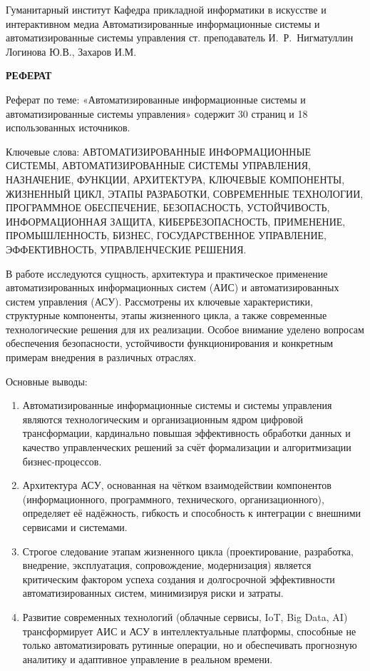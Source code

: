 \documentclass{SibFU-docs}
\begin{document}
\renewcommand{\contentsname}{}
\mycovertitle
{Гуманитарный институт}
{Кафедра прикладной информатики в искусстве и интерактивном медиа}
{Автоматизированные информационные системы и автоматизированные системы управления}
{ст. преподаватель И.~Р.~Нигматуллин}
{Логинова Ю.В., Захаров И.М.}
 
\begin{center}
\bfseries РЕФЕРАТ
\end{center}
\noindent

Реферат по теме: «Автоматизированные информационные системы и автоматизированные системы управления» содержит 30 страниц и 18 использованных источников.

Ключевые слова:
АВТОМАТИЗИРОВАННЫЕ ИНФОРМАЦИОННЫЕ СИСТЕМЫ, АВТОМАТИЗИРОВАННЫЕ СИСТЕМЫ УПРАВЛЕНИЯ, НАЗНАЧЕНИЕ, ФУНКЦИИ, АРХИТЕКТУРА, КЛЮЧЕВЫЕ КОМПОНЕНТЫ, ЖИЗНЕННЫЙ ЦИКЛ, ЭТАПЫ РАЗРАБОТКИ, СОВРЕМЕННЫЕ ТЕХНОЛОГИИ, ПРОГРАММНОЕ ОБЕСПЕЧЕНИЕ, БЕЗОПАСНОСТЬ, УСТОЙЧИВОСТЬ, ИНФОРМАЦИОННАЯ ЗАЩИТА, КИБЕРБЕЗОПАСНОСТЬ, ПРИМЕНЕНИЕ, ПРОМЫШЛЕННОСТЬ, БИЗНЕС, ГОСУДАРСТВЕННОЕ УПРАВЛЕНИЕ, ЭФФЕКТИВНОСТЬ, УПРАВЛЕНЧЕСКИЕ РЕШЕНИЯ.

В работе исследуются сущность, архитектура и практическое применение автоматизированных информационных систем (АИС) и автоматизированных систем управления (АСУ). Рассмотрены их ключевые характеристики, структурные компоненты, этапы жизненного цикла, а также современные технологические решения для их реализации. Особое внимание уделено вопросам обеспечения безопасности, устойчивости функционирования и конкретным примерам внедрения в различных отраслях.

Основные выводы:

\begin{enumerate}
\item Автоматизированные информационные системы и системы управления являются технологическим и организационным ядром цифровой трансформации, кардинально повышая эффективность обработки данных и качество управленческих решений за счёт формализации и алгоритмизации бизнес-процессов.

\item Архитектура АСУ, основанная на чётком взаимодействии компонентов (информационного, программного, технического, организационного), определяет её надёжность, гибкость и способность к интеграции с внешними сервисами и системами.

\item Строгое следование этапам жизненного цикла (проектирование, разработка, внедрение, эксплуатация, сопровождение, модернизация) является критическим фактором успеха создания и долгосрочной эффективности автоматизированных систем, минимизируя риски и затраты.

\item Развитие современных технологий (облачные сервисы, IoT, Big Data, AI) трансформирует АИС и АСУ в интеллектуальные платформы, способные не только автоматизировать рутинные операции, но и обеспечивать прогнозную аналитику и адаптивное управление в реальном времени.
\end{enumerate}
\end{document}
